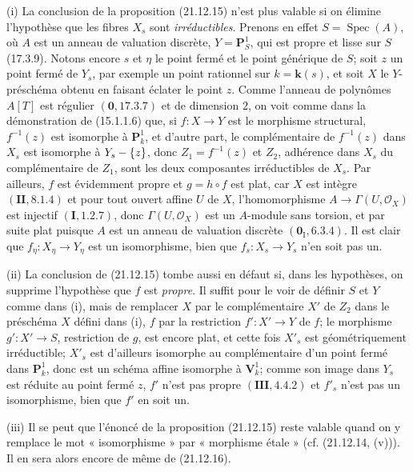 \begin{remarks}[21.12.17]
\label{IV.21.12.17}
(i) La conclusion de la proposition (21.12.15) n'est plus valable si on élimine
l'hypothèse que les fibres $X_s$ sont \emph{irréductibles}. Prenons en effet
$S=\operatorname{Spec}(A)$, où $A$ est un anneau de valuation discrète,
$Y=\mathbf P^1_S$, qui est propre et lisse sur $S$ (17.3.9). Notons encore $s$ et
$\eta$ le point fermé et le point générique de $S$; soit $z$ un point fermé de $Y_s$,
par exemple un point rationnel sur $k=\boldsymbol{k}(s)$, et soit $X$ le $Y$-préschéma obtenu en
faisant éclater le point $z$. Comme l'anneau de polynômes $A[T]$ est régulier
$(\mathbf 0, 17.3.7)$ et de dimension $2$, on voit comme dans la démonstration de
(15.1.1.6) que, si $f:X\to Y$ est le morphisme structural, $f^{-1}(z)$ est isomorphe
à $\mathbf P^1_k$, et d'autre part, le complémentaire de $f^{-1}(z)$ dans $X_s$ est
isomorphe à $Y_s-\{z\}$, donc $Z_1=f^{-1}(z)$ et $Z_2$, adhérence dans $X_s$ du
complémentaire de $Z_1$, sont les deux composantes irréductibles de $X_s$. Par
ailleurs, $f$ est évidemment propre et $g=h\circ f$ est plat, car $X$ est intègre
$(\mathbf{II}, 8.1.4)$ et pour tout ouvert affine $U$ de $X$, l'homomorphisme
$A\to\Gamma(U,\mathcal O_X)$ est injectif $(\mathbf I, 1.2.7)$, donc
$\Gamma(U,\mathcal O_X)$ est un $A$-module sans torsion, et par suite plat puisque $A$
est un anneau de valuation discrète $(\mathbf 0_{\mathrm I}, 6.3.4)$. Il est clair que
$f_\eta:X_\eta\to Y_\eta$ est un isomorphisme, bien que
$f_s:X_s\to Y_s$ n'en soit pas un.

(ii) La conclusion de (21.12.15) tombe aussi en défaut si, dans les hypothèses, on
supprime l'hypothèse que $f$ est \emph{propre}. Il suffit pour le voir de définir $S$ et
$Y$ comme dans (i), mais de remplacer $X$ par le complémentaire $X'$ de $Z_2$ dans le
préschéma $X$ défini dans (i), $f$ par la restriction $f':X'\to Y$ de $f$; le morphisme
$g':X'\to S$, restriction de $g$, est encore plat, et cette fois $X'_s$ est
géométriquement irréductible; $X'_s$ est d'ailleurs isomorphe au complémentaire d'un
point fermé dans $\mathbf P^1_k$, donc est un schéma affine isomorphe à $\mathbf V^1_k$;
comme son image dans $Y_s$ est réduite au point fermé $z$, $f'$ n'est pas propre
$(\mathbf{III}, 4.4.2)$ et $f'_s$ n'est pas un isomorphisme, bien que $f'$ en soit
un.

(iii) Il se peut que l'énoncé de la proposition (21.12.15) reste valable quand on y
remplace le mot « isomorphisme » par « morphisme étale » (cf. (21.12.14, (v))). Il en
sera alors encore de même de (21.12.16).
\end{remarks}
